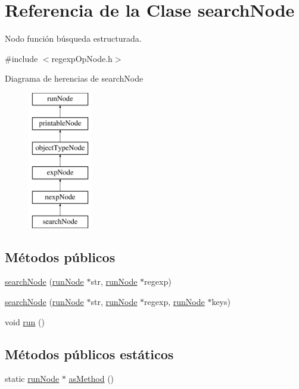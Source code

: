 \hypertarget{classsearchNode}{\section{Referencia de la Clase search\-Node}
\label{classsearchNode}
}


Nodo función búsqueda estructurada.  




{\ttfamily \#include $<$regexp\-Op\-Node.\-h$>$}

Diagrama de herencias de search\-Node\begin{figure}[H]
\begin{center}
\leavevmode
\includegraphics[height=6.000000cm]{classsearchNode}
\end{center}
\end{figure}
\subsection*{Métodos públicos}
\begin{DoxyCompactItemize}
\item 
\hyperlink{classsearchNode_a0d38f0ec41707bc09dd659e763c2e4c8}{search\-Node} (\hyperlink{classrunNode}{run\-Node} $\ast$str, \hyperlink{classrunNode}{run\-Node} $\ast$regexp)
\item 
\hyperlink{classsearchNode_ac169cce12ddc6f263f3f75caa1e3f90d}{search\-Node} (\hyperlink{classrunNode}{run\-Node} $\ast$str, \hyperlink{classrunNode}{run\-Node} $\ast$regexp, \hyperlink{classrunNode}{run\-Node} $\ast$keys)
\item 
void \hyperlink{classsearchNode_aee137a8b956e6582c22588117efbc366}{run} ()
\end{DoxyCompactItemize}
\subsection*{Métodos públicos estáticos}
\begin{DoxyCompactItemize}
\item 
static \hyperlink{classrunNode}{run\-Node} $\ast$ \hyperlink{classsearchNode_a655e0f65fc124e090347020d3ac6c703}{as\-Method} ()
\end{DoxyCompactItemize}


